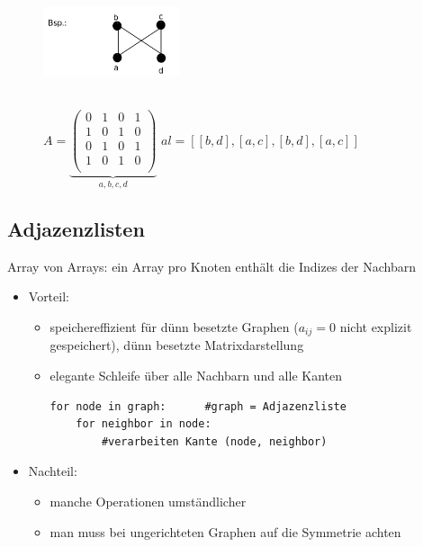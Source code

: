 \documentclass[11pt, fleqn]{scrreprt}
\begin{document}
    \begin{figure}[htbp]
        \begin{minipage}[t]{4cm}
            \vspace{0cm}
            \includegraphics[width=4cm,height=3cm,keepaspectratio]{./Pictures/Adjazenzmatrix.png}
        \end{minipage}
        \begin{minipage}[t]{12cm}
            \vspace{0.0cm}
            $A = \underbrace{\begin{pmatrix}
            0 & 1 & 0 & 1 \\
            1 & 0 & 1 & 0 \\
            0 & 1 & 0 & 1 \\
            1 & 0 & 1 & 0 \\
            \end{pmatrix} }_{a, b, c, d}$ \hspace*{1cm} $al = [[b, d], [a, c], [b, d], [a,c]]$
        \end{minipage}
    \end{figure}

    \subsection*{Adjazenzlisten}
    Array von Arrays: ein Array pro Knoten enthält die Indizes der Nachbarn
    \begin{itemize}
        \item Vorteil:
        \begin{itemize}
            \item speichereffizient für dünn besetzte Graphen ($a_{ij} = 0$ nicht explizit gespeichert), \glqq dünn besetzte Matrixdarstellung\grqq
            \item elegante Schleife über alle Nachbarn und alle Kanten
            \begin{verbatim}
for node in graph:      #graph = Adjazenzliste
    for neighbor in node:
        #verarbeiten Kante (node, neighbor)
            \end{verbatim}
        \end{itemize}
        \item Nachteil:
        \begin{itemize}
            \item manche Operationen umständlicher
            \item man muss bei ungerichteten Graphen auf die Symmetrie achten
        \end{itemize}
    \end{itemize}
\end{document}
